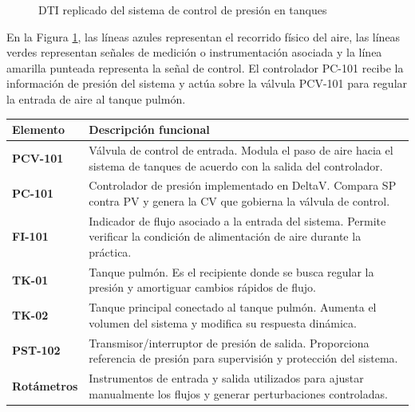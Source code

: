 \documentclass[12pt,letterpaper]{article}
\begin{document}
\begin{figure}[H]
{
}
\caption{DTI replicado del sistema de control de presión en tanques}
\label{fig:dti_tikz}
\end{figure}

En la Figura \ref{fig:dti_tikz}, las líneas azules representan el recorrido físico del aire, las líneas verdes representan señales de medición o instrumentación asociada y la línea amarilla punteada representa la señal de control. El controlador PC-101 recibe la información de presión del sistema y actúa sobre la válvula PCV-101 para regular la entrada de aire al tanque pulmón.

\begin{center}
\small
\begin{tabular}{>{\bfseries}p{2.8cm} p{10cm}}
\toprule
\textbf{Elemento} & \textbf{Descripción funcional} \\
\midrule
PCV-101 & Válvula de control de entrada. Modula el paso de aire hacia el sistema de tanques de acuerdo con la salida del controlador. \\
\addlinespace
PC-101 & Controlador de presión implementado en DeltaV. Compara SP contra PV y genera la CV que gobierna la válvula de control. \\
\addlinespace
FI-101 & Indicador de flujo asociado a la entrada del sistema. Permite verificar la condición de alimentación de aire durante la práctica. \\
\addlinespace
TK-01 & Tanque pulmón. Es el recipiente donde se busca regular la presión y amortiguar cambios rápidos de flujo. \\
\addlinespace
TK-02 & Tanque principal conectado al tanque pulmón. Aumenta el volumen del sistema y modifica su respuesta dinámica. \\
\addlinespace
PST-102 & Transmisor/interruptor de presión de salida. Proporciona referencia de presión para supervisión y protección del sistema. \\
\addlinespace
Rotámetros & Instrumentos de entrada y salida utilizados para ajustar manualmente los flujos y generar perturbaciones controladas. \\
\bottomrule
\end{tabular}
\end{center}
\end{document}
